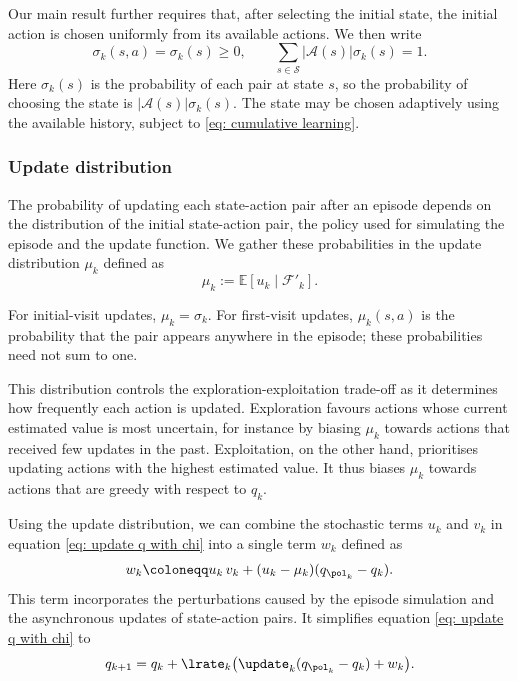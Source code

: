 Our main result further requires that, after selecting the initial state, the initial action is chosen uniformly from its available actions. We then write
\begin{equation}
\label{eq: uniform starts}
\sigma_k(s,a)=\sigma_k(s)\ge0,
\qquad
\sum_{s\in\mathcal S}|\mathcal A(s)|\sigma_k(s)=1.
\end{equation}
Here $\sigma_k(s)$ is the probability of each pair at state $s$, so the probability of choosing the state is $|\mathcal A(s)|\sigma_k(s)$. The state may be chosen adaptively using the available history, subject to \eqref{eq: cumulative learning}.

\subsubsection{Update distribution}

The probability of updating each state-action pair after an episode depends on the distribution of the initial state-action pair, the policy used for simulating the episode and the update function.
We gather these probabilities in the update distribution $\mu_k$ defined as
\[
\mu_k := \mathbb E [ u_k \mid \mathcal F'_k] .
\]


For initial-visit updates, $\mu_k=\sigma_k$. For first-visit updates, $\mu_k(s,a)$ is the probability that the pair appears anywhere in the episode; these probabilities need not sum to one.

This distribution controls the exploration-exploitation trade-off
as it determines how frequently each action is updated.
Exploration favours actions whose current estimated value is most uncertain, for instance by biasing $\mu_k$ towards actions that received few updates in the past.
Exploitation, on the other hand, prioritises updating actions with the highest estimated value. It thus biases $\mu_k$ towards actions that are greedy with respect to $q_k$.


Using the update distribution, 
we can combine the stochastic terms $u_k$ and $v_k$ in equation \eqref{eq: update q with chi} into a single term $w_k$ defined as
\begin{align}
\label{eq: definition combined noise}
    w_k
    \coloneqq 
    u_k \, v_k + (u_k - \mu_k) ( q_{\pol_k} - q_k ) .
\end{align}
This term incorporates the perturbations caused by the episode simulation and the asynchronous updates of state-action pairs.
It simplifies equation \eqref{eq: update q with chi} to
\begin{align}
\label{eq: mcopi not yet sri}
    q_{k+1}
    =
    q_k + \lrate_k \big( \update_k ( q_{\pol_k} - q_k ) + w_k \big) .
\end{align}


